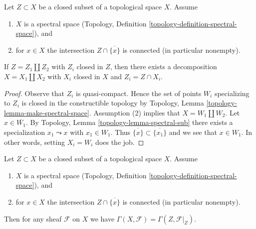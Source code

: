\begin{lemma}
\label{lemma-connected-topological}
Let $Z \subset X$ be a closed subset of a topological space $X$.
Assume
\begin{enumerate}
\item $X$ is a spectral space
(Topology, Definition \ref{topology-definition-spectral-space}), and
\item for $x \in X$ the intersection $Z \cap \overline{\{x\}}$
is connected (in particular nonempty).
\end{enumerate}
If $Z = Z_1 \amalg Z_2$ with $Z_i$ closed in $Z$,
then there exists a decomposition $X = X_1 \amalg X_2$ with
$X_i$ closed in $X$ and $Z_i = Z \cap X_i$.
\end{lemma}

\begin{proof}
Observe that $Z_i$ is quasi-compact. Hence the set of points
$W_i$ specializing to $Z_i$ is closed in the constructible topology
by Topology, Lemma \ref{topology-lemma-make-spectral-space}.
Assumption (2) implies that $X = W_1 \amalg W_2$.
Let $x \in \overline{W_1}$. By
Topology, Lemma \ref{topology-lemma-spectral-sub}
there exists a specialization $x_1 \leadsto x$ with $x_1 \in W_1$.
Thus $\overline{\{x\}} \subset \overline{\{x_1\}}$ and we see
that $x \in W_1$. In other words, setting $X_i = W_i$ does the job.
\end{proof}

\begin{lemma}
\label{lemma-h0-topological}
Let $Z \subset X$ be a closed subset of a topological space $X$.
Assume
\begin{enumerate}
\item $X$ is a spectral space
(Topology, Definition \ref{topology-definition-spectral-space}), and
\item for $x \in X$ the intersection $Z \cap \overline{\{x\}}$
is connected (in particular nonempty).
\end{enumerate}
Then for any sheaf $\mathcal{F}$ on $X$ we have
$\Gamma(X, \mathcal{F}) = \Gamma(Z, \mathcal{F}|_Z)$.
\end{lemma}

